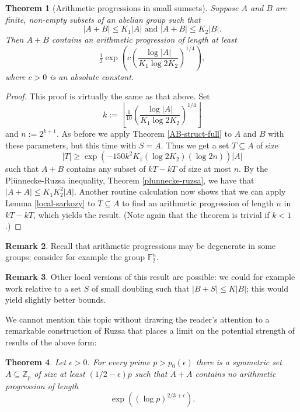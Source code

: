 \documentclass[12pt,a4paper,reqno]{amsart}
\numberwithin{equation}{section}
\theoremstyle{plain}
\newtheorem{theorem}{Theorem}[section]
\theoremstyle{definition}
\newtheorem{remark}[theorem]{Remark}
\renewcommand{\leq}{\leqslant}
\renewcommand{\geq}{\geqslant}
\renewcommand{\subset}{\subseteq}
\def\Z{\mathbb{Z}}
\def\F{\mathbb{F}}
\newcommand{\Zmod}[1]{\Z_#1} %
\begin{document}
\begin{theorem}[Arithmetic progressions in small sumsets]
Suppose $A$ and $B$ are finite, non-empty subsets of an abelian group such that 
\[ |A+B| \leq K_1 |A| \text{ and } |A+B| \leq K_2 |B|. \]
Then $A+B$ contains an arithmetic progression of length at least
\[ \tfrac{1}{2} \exp\left( c \left( \frac{\log{|A|}}{K_1 \log{2K_2}} \right)^{1/4} \right), \]
where $c > 0$ is an absolute constant.
\end{theorem}
\begin{proof}
This proof is virtually the same as that above. Set
\[ k := \left\lfloor \tfrac{1}{10} \left( \frac{\log{|A|}}{K_1 \log{2K_2}} \right)^{1/4} \right\rfloor \]
and $n := 2^{k+1}$. As before we apply Theorem \ref{AB-struct-full} to $A$ and $B$ with these parameters, but this time with $S = A$. Thus we get a set $T \subset A$ of size
\[ |T| \geq \exp\left(-150 k^2 K_1 (\log{2K_2}) (\log{2n}) \right) |A| \]
such that $A+B$ contains any subset of $kT-kT$ of size at most $n$. By the Pl\"unnecke-Ruzsa inequality, Theorem \ref{plunnecke-ruzsa}, we have that $|A+A| \leq K_1 K_2^2 |A|$. Another routine calculation now shows that we can apply Lemma \ref{local-sarkozy} to $T \subset A$ to find an arithmetic progression of length $n$ in $kT-kT$, which yields the result. (Note again that the theorem is trivial if $k < 1$.)
\end{proof}
\begin{remark}
Recall that arithmetic progressions may be degenerate in some groups; consider for example the group $\F_2^n$.
\end{remark}
\begin{remark}
Other local versions of this result are possible: we could for example work relative to a set $S$ of small doubling such that $|B+S| \leq K|B|$; this would yield slightly better bounds.
\end{remark}

We cannot mention this topic without drawing the reader's attention to a remarkable construction \cite{ruzsa:longAPs} of Ruzsa that places a limit on the potential strength of results of the above form:

\begin{theorem}
Let $\epsilon > 0$. For every prime $p > p_0(\epsilon)$ there is a symmetric set $A \subset \Zmod{p}$ of size at least $(1/2 - \epsilon)p$ such that $A+A$ contains no arithmetic progression of length 
\[ \exp\left( (\log{p})^{2/3+\epsilon} \right). \]
\end{theorem}
\end{document}
